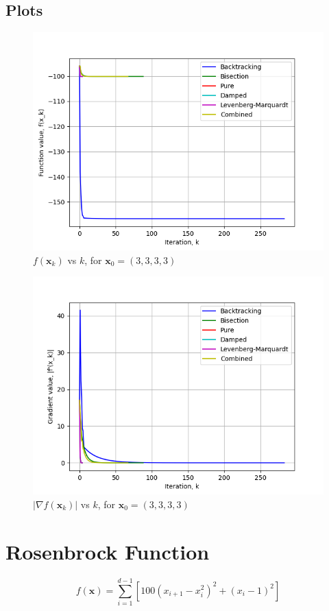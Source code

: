 \documentclass[a4paper]{article}
\begin{document}
\subsection{Plots}

\begin{figure}[H]
      \centering
      \includegraphics[width=.75\textwidth]{styblinski_tang_function_vals.png}
      \caption{$f(\textbf{x}_k)$ vs $k$, for $\textbf{x}_0 = (3, 3, 3, 3)$}
\end{figure}

\begin{figure}[H]
    \centering
    \includegraphics[width=.75\textwidth]{styblinski_tang_function_grad.png}
    \caption{$|\nabla f(\textbf{x}_k)|$ vs $k$, for $\textbf{x}_0 = (3, 3, 3, 3)$}
\end{figure}

\section{Rosenbrock Function}

$$f(\textbf{x}) = \sum_{i=1}^{d-1} [ 100(x_{i+1} - x_i^2)^2 + (x_i - 1)^2 ]$$
\end{document}
